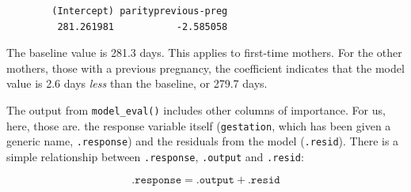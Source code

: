 \documentclass[
  letterpaper,
  DIV=11,
  numbers=noendperiod,
  oneside]{scrreprt}
\begin{document}
\begin{verbatim}
        (Intercept) parityprevious-preg 
         281.261981           -2.585058 
\end{verbatim}

The baseline value is 281.3 days. This applies to first-time mothers.
For the other mothers, those with a previous pregnancy, the coefficient
indicates that the model value is 2.6 days \emph{less} than the
baseline, or 279.7 days.

The output from \texttt{model\_eval()} includes other columns of
importance. For us, here, those are. the response variable itself
(\texttt{gestation}, which has been given a generic name,
\texttt{.response}) and the residuals from the model (\texttt{.resid}).
There is a simple relationship between \texttt{.response},
\texttt{.output} and \texttt{.resid}:

\[\mathtt{.response} = \mathtt{.output} + \mathtt{.resid}\]
\end{document}
